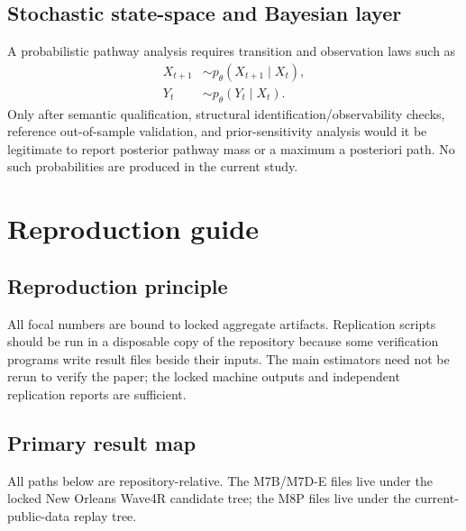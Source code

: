 \documentclass[11pt]{article}
\begin{document}
\subsection{Stochastic state-space and Bayesian layer}

A probabilistic pathway analysis requires transition and observation laws such as
\begin{align}
X_{t+1}&\sim p_\theta(X_{t+1}\mid X_t),\\
Y_t&\sim p_\theta(Y_t\mid X_t).
\end{align}
Only after semantic qualification, structural identification/observability checks, reference out-of-sample validation, and prior-sensitivity analysis would it be legitimate to report posterior pathway mass or a maximum a posteriori path. No such probabilities are produced in the current study.

\section{Reproduction guide}
\label{sec:repro}

\subsection{Reproduction principle}

All focal numbers are bound to locked aggregate artifacts. Replication scripts should be run in a disposable copy of the repository because some verification programs write result files beside their inputs. The main estimators need not be rerun to verify the paper; the locked machine outputs and independent replication reports are sufficient.

\subsection{Primary result map}

All paths below are repository-relative. The M7B/M7D-E files live under the locked New Orleans Wave4R candidate tree; the M8P files live under the current-public-data replay tree.
\end{document}
